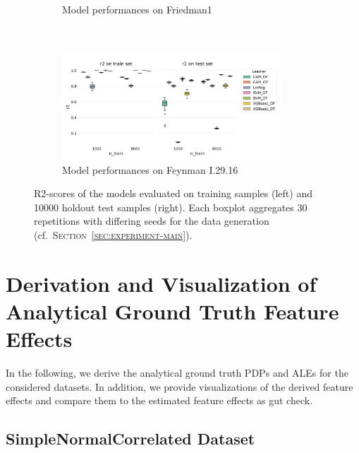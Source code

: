 \documentclass[runningheads]{llncs}
\begin{document}
\begin{figure}[h!]
\begin{subfigure}[b]{\textwidth}
        \caption{Model performances on Friedman1}
    \end{subfigure}
    \\[10pt]
    \vfill
    \begin{subfigure}[b]{\textwidth}
        \centering
        \includegraphics[width=0.9\textwidth]{img/model_performance_FeynmanI.29.16.png}
        \caption{Model performances on Feynman I.29.16}
    \end{subfigure}
    \caption{R2-scores of the models evaluated on training samples (left) and 10000 holdout test samples (right). Each boxplot aggregates 30 repetitions with differing seeds for the data generation (cf.\ \textsc{Section~\ref{sec:experiment-main}}).}
    \label{fig:model-performance}  %
\end{figure}

\clearpage
\section{Derivation and Visualization of Analytical Ground Truth Feature Effects}\label{app:ground-truth-feature-effects}
In the following, we derive the analytical ground truth PDPs and ALEs for the
considered datasets. In addition, we provide visualizations of the derived
feature effects and compare them to the estimated feature effects as gut check.

\subsection{SimpleNormalCorrelated Dataset}
\end{document}
